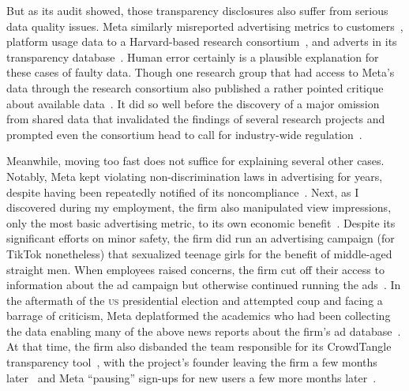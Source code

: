 \documentclass[nonacm,screen]{acmart}
\newcommand\V[1]{\textsc{\MakeLowercase{#1}}}
\begin{document}
But as its audit showed, those transparency disclosures also suffer from serious
data quality issues. Meta similarly misreported advertising metrics to
customers~\cite{BruellPatel2020,Hutchinson2016,Hutchinson2016b,Hutchinson2017,
VranicaMarshall2016}, platform usage data to a Harvard-based research
consortium~\cite{Timberg2021}, and adverts in its transparency
database~\cite{Rosenberg2019,ScottMontellaro2021,SilvermanMac2020a}. Human error
certainly is a plausible explanation for these cases of faulty data. Though one
research group that had access to Meta's data through the research consortium
also published a rather pointed critique about available
data~\cite{Hegelich2020,HegelichMarcoea2020}. It did so well before the
discovery of a major omission from shared data that invalidated the findings of
several research projects and prompted even the consortium head to call for
industry-wide regulation~\cite{PersilyTucker2021}.

Meanwhile, moving too fast does not suffice for explaining several other cases.
Notably, Meta kept violating non-discrimination laws in advertising for years,
despite having been repeatedly notified of its
noncompliance~\cite{AngwinParrisJr2016,AngwinScheiberea2017,AngwinTobinea2017,
KofmanTobin2019,Kofman2022,Merrill2020,TobinMerrill2018}. Next, as I discovered
during my employment, the firm also manipulated view impressions, only the most
basic advertising metric, to its own economic benefit~\cite{Grimm2022c}. Despite
its significant efforts on minor safety, the firm did run an advertising
campaign (for TikTok nonetheless) that sexualized teenage girls for the benefit
of middle-aged straight men. When employees raised concerns, the firm cut off
their access to information about the ad campaign but otherwise continued
running the ads~\cite{SilvermanMac2020}. In the aftermath of the \V{US}
presidential election and attempted coup and facing a barrage of criticism, Meta
deplatformed the academics who had been collecting the data enabling many of the
above news reports about the firm's ad database~\cite{EdelsonMcCoy2021,
EdelsonMcCoy2021a}. At that time, the firm also disbanded the team responsible
for its CrowdTangle transparency tool~\cite{Roose2021a}, with the project's
founder leaving the firm a few months later~\cite{Heath2021} and Meta
``pausing'' sign-ups for new users a few more months
later~\cite{PatelCulliford2022}.
\end{document}
